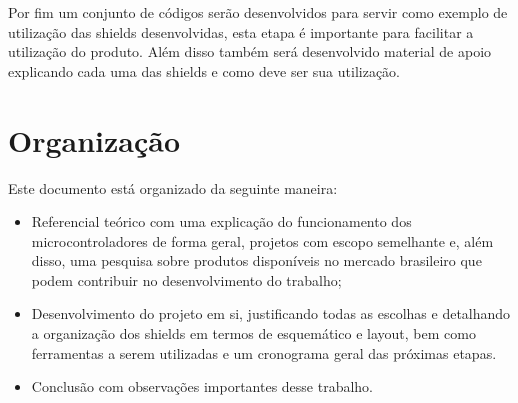 Por fim um conjunto de códigos serão desenvolvidos para servir como exemplo de utilização das shields desenvolvidas, esta etapa é importante para facilitar a utilização do produto. Além disso também será desenvolvido material de apoio explicando cada uma das shields e como deve ser sua utilização.

\section{Organização}

Este documento está organizado da seguinte maneira:

\begin{itemize}
	\item Referencial teórico com uma explicação do funcionamento dos microcontroladores de forma geral, projetos com escopo semelhante e, além disso, uma pesquisa sobre produtos disponíveis no mercado brasileiro que podem contribuir no desenvolvimento do trabalho;
	\item Desenvolvimento do projeto em si, justificando todas as escolhas e detalhando a organização dos shields em termos de esquemático e layout, bem como ferramentas a serem utilizadas e um cronograma geral das próximas etapas.
	\item Conclusão com observações importantes desse trabalho.
\end{itemize}